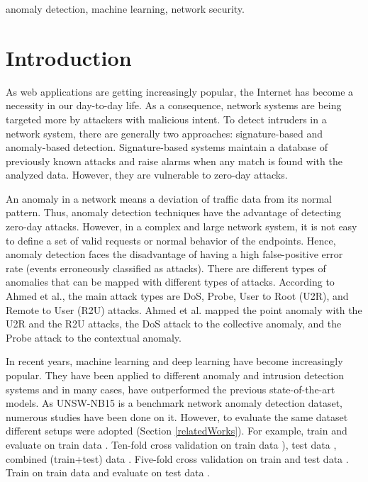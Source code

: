 \documentclass[14pt, conference]{IEEEtran}
\begin{document}
\begin{IEEEkeywords}
anomaly detection, machine learning,  network security.
\end{IEEEkeywords}

\section{Introduction}
As web applications are getting increasingly popular, the Internet has become a necessity in our day-to-day life. As a
consequence, network systems are being targeted more by attackers with malicious intent. To detect intruders in a
network system, there are generally two approaches: signature-based and anomaly-based detection. Signature-based systems maintain a database of previously known attacks and raise alarms when any match is found with the analyzed data. However, they are vulnerable to zero-day attacks.

An anomaly in a network means a deviation of traffic data from its normal pattern. Thus, anomaly detection techniques have the advantage of detecting zero-day attacks. However, in a complex and large network system,  it is not easy to define a set of valid requests or normal behavior of the endpoints. Hence, anomaly detection faces the disadvantage of having a high false-positive error rate (events erroneously classified as attacks). There are different types of anomalies that can be mapped with different types of attacks. According to Ahmed et al.\cite{ahmed2016survey}, the main attack types are DoS, Probe, User to Root (U2R), and Remote to User (R2U) attacks. Ahmed et al. \cite{ahmed2016survey} mapped the point anomaly with the U2R and the R2U attacks, the DoS attack to the collective anomaly, and the Probe attack to the contextual anomaly.

In recent years, machine learning and deep learning have become increasingly popular. They have been applied to different anomaly and intrusion detection systems %
and in many cases, have outperformed the previous state-of-the-art models. As UNSW-NB15 \cite{moustafa2015unsw} is a benchmark network anomaly detection dataset, numerous studies have been done on it.
However, to evaluate the same dataset different setups were adopted (Section \ref{relatedWorks}). For example, train and evaluate on train data \cite{mogal2017nids, Kanimozhi2019UNSW-NB15} . Ten-fold cross validation on train data \cite{suleiman2018performance, meftah2019network}), test data \cite{hanif2019intrusion}, combined (train+test) data  \cite{nawir2019effective, koroniotis2017towards}. Five-fold cross validation on train and test data \cite{meghdouri2018analysis} . Train on train data and evaluate on test data  \cite{bhamare2016feasibility, moustafa2016evaluation}.
\end{document}
